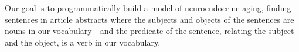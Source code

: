 Our goal is to programmatically build a model of neuroendocrine aging,
finding sentences in article abstracts where the subjects and objects
of the sentences are nouns in our vocabulary - and the predicate of the
sentence, relating the subject and the object, is a verb in our
vocabulary.
